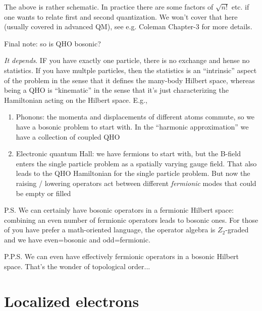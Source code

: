 The above is rather schematic. In practice there are some factors of $\sqrt{n!}$ etc. if one wants to relate first and second quantization. We won't cover that here (usually covered in advanced QM), see e.g. Coleman Chapter-3 for more details.

Final note: so is QHO bosonic?

\emph{It depends}. IF you have exactly one particle, there is no exchange and hense no statistics. If you have multple particles, then the statistics is an ``intrinsic'' aspect of the problem in the sense that it defines the many-body Hilbert space, whereas being a QHO is ``kinematic'' in the sense that it's just characterizing the Hamiltonian acting on the Hilbert space. E.g.,
\begin{enumerate}
    \item Phonons: the momenta and displacements of different atoms commute, so we have a bosonic problem to start with. In the ``harmonic approximation'' we have a collection of coupled QHO
    \item Electronic quantum Hall: we have fermions to start with, but the B-field enters the single particle problem as a spatially varying gauge field. That also leads to the QHO Hamiltonian for the single particle problem. But now the raising / lowering operators act between different \emph{fermionic} modes that could be empty or filled
\end{enumerate}

P.S. We can certainly have bosonic operators in a fermionic Hilbert space: combining an even number of fermionic operators leads to bosonic ones. For those of you have prefer a math-oriented language, the operator algebra is $Z_2$-graded and we have even=bosonic and odd=fermionic.

P.P.S. We can even have effectively fermionic operators in a bosonic Hilbert space. That's the wonder of topological order...

\section{Localized electrons}

